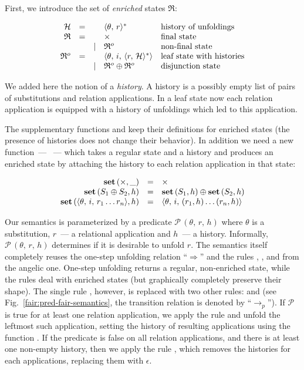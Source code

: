 First, we introduce the set of \emph{enriched} states $\mathfrak{R}$:

\[
\begin{array}{rccll}
  \mathcal{H}    & = &      & \langle \theta,\,r \rangle^* & \mbox{history of unfoldings}\\
  \mathfrak{R}   & = &      & \times & \mbox{final state}\\
                 &   & \mid & \mathfrak{R}^o & \mbox{non-final state}\\
  \mathfrak{R}^o & = &      & \langle \theta,\, i,\, \langle r,\, \mathcal{H} \rangle^* \rangle & \mbox{leaf state with histories}\\
                 &   & \mid & \mathfrak{R}^o \oplus \mathfrak{R}^o & \mbox{disjunction state}
\end{array}
\]

We added here the notion of a \emph{history}. A history is a possibly empty list of pairs of substitutions and relation applications. In a leaf state now each
relation application is equipped with a history of unfoldings which led to this application.

The supplementary functions  and  keep their definitions for enriched states (the presence of histories does not change their behavior).
In addition we need a new function~--- ~--- which takes a regular state and a history and produces an enriched state by attaching the
history to each relation application in that state:

\[
\begin{array}{rcl}
    \mbox{\bf set}\,(\times, \_) & = & \times \\
    \mbox{\bf set}\,(S_1 \oplus S_2, h) & = & \mbox{\bf set}\,(S_1, h) \oplus \mbox{\bf set}\,(S_2, h) \\
    \mbox{\bf set}\,(\langle \theta,\, i,\, r_1\ldots r_n \rangle, h) & = & \langle \theta,\, i,\, (r_1, h) \ldots (r_n, h) \rangle 
\end{array}
\]

Our semantics is parameterized by a predicate $\mathcal{P}\,(\theta,\,r,\,h)$ where $\theta$ is a substitution, $r$~--- a relational application and $h$~--- a history. Informally,
$\mathcal{P}\,(\theta,\,r,\,h)$ determines if it is desirable to unfold $r$. The semantics itself completely reuses the one-step unfolding relation ``$\Rightarrow$'' and the
rules , , and  from the angelic one. One-step unfolding returns a regular, non-enriched state, while the rules deal with enriched
states (but graphically completely preserve their shape). The single rule , however, is replaced with two other rules:  and 
(see Fig.~\ref{fair:pred-fair-semantics}, the transition relation is denoted by ``$\rightarrow_p$''). If $\mathcal{P}$ is true for at least one relation application, we apply the
rule  and unfold the leftmost such application, setting the history of resulting applications using the function . If the predicate is false on all
relation applications, and there is at least one non-empty history, then we apply the rule , which removes the histories for each applications, replacing
them with $\epsilon$. 

